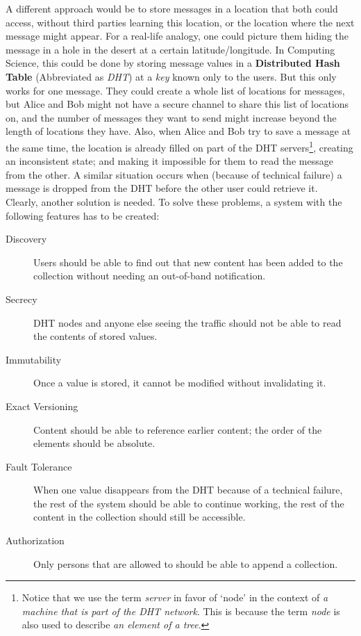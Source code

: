 \documentclass[a4paper]{article}
\begin{document}
A different approach would be to store messages in a location that both could access, without third parties learning this location, or the location where the next message might appear. For a real-life analogy, one could picture them hiding the message in a hole in the desert at a certain latitude/longitude. In Computing Science, this could be done by storing message values in a \textbf{Distributed Hash Table} (Abbreviated as \textit{DHT}) at a \textit{key} known only to the users. But this only works for one message. They could create a whole list of locations for messages, but Alice and Bob might not have a secure channel to share this list of locations on, and the number of messages they want to send might increase beyond the length of locations they have. Also, when Alice and Bob try to save a message at the same time, the location is already filled on part of the DHT servers\footnote{Notice that we use the term \textit{server} in favor of `node' in the context of \textit{a machine that is part of the DHT network}. This is because the term \textit{node} is also used to describe \textit{an element of a tree}.}, creating an inconsistent state; and making it impossible for them to read the message from the other. A similar situation occurs when (because of technical failure) a message is dropped from the DHT before the other user could retrieve it.\\

Clearly, another solution is needed. To solve these problems, a system with the following features has to be created:

\begin{description}
	\item[Discovery] Users should be able to find out that new content has been added to the collection without needing an out-of-band notification.
	\item[Secrecy] DHT nodes and anyone else seeing the traffic should not be able to read the contents of stored values.
	\item[Immutability] Once a value is stored, it cannot be modified without invalidating it.
	\item[Exact Versioning] Content should be able to reference earlier content; the order of the elements should be absolute.
	\item[Fault Tolerance] When one value disappears from the DHT because of a technical failure, the rest of the system should be able to continue working, the rest of the content in the collection should still be accessible.
	\item[Authorization] Only persons that are allowed to should be able to append a collection.

\end{description}
\end{document}
